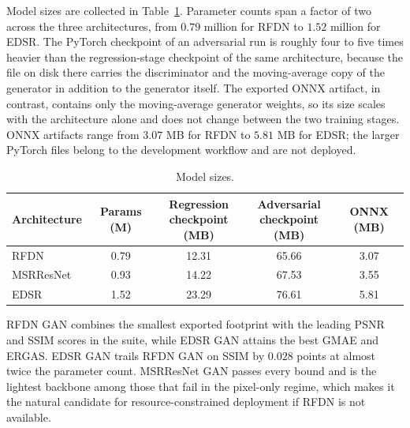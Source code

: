 Model sizes are collected in Table~\ref{tab:model_sizes}. Parameter counts span a factor of two across the three architectures, from $0.79$ million for RFDN to $1.52$ million for EDSR. The PyTorch checkpoint of an adversarial run is roughly four to five times heavier than the regression-stage checkpoint of the same architecture, because the file on disk there carries the discriminator and the moving-average copy of the generator in addition to the generator itself. The exported ONNX artifact, in contrast, contains only the moving-average generator weights, so its size scales with the architecture alone and does not change between the two training stages. ONNX artifacts range from $3.07$ MB for RFDN to $5.81$ MB for EDSR; the larger PyTorch files belong to the development workflow and are not deployed.

\begin{table}[t]
\captionsetup{justification=centering}
\centering
\caption{Model sizes.}
\label{tab:model_sizes}
\small
\setlength{\tabcolsep}{8pt}
\begin{tabular}{l c c c c}
\toprule
Architecture & Params (M) & \makecell{Regression \\ checkpoint (MB)} & \makecell{Adversarial \\ checkpoint (MB)} & ONNX (MB) \\
\midrule
RFDN      & 0.79 & 12.31 & 65.66 & 3.07 \\
MSRResNet & 0.93 & 14.22 & 67.53 & 3.55 \\
EDSR      & 1.52 & 23.29 & 76.61 & 5.81 \\
\bottomrule
\end{tabular}
\end{table}

RFDN GAN combines the smallest exported footprint with the leading PSNR and SSIM scores in the suite, while EDSR GAN attains the best GMAE and ERGAS. EDSR GAN trails RFDN GAN on SSIM by $0.028$ points at almost twice the parameter count. MSRResNet GAN passes every bound and is the lightest backbone among those that fail in the pixel-only regime, which makes it the natural candidate for resource-constrained deployment if RFDN is not available.

